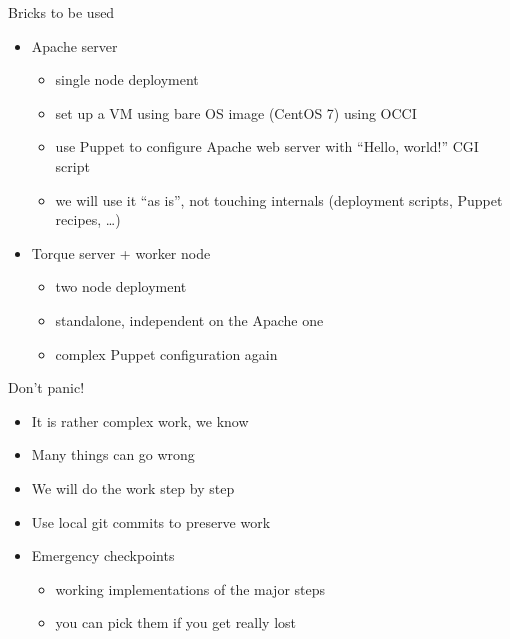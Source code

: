 \documentclass[smaller,t]{beamer}
\begin{document}
\begin{frame}{Bricks to be used}
\begin{itemize}
\item Apache server
\begin{itemize}
\item single node deployment
\item set up a VM using bare OS image (CentOS 7) using OCCI
\item use Puppet to configure Apache web server with ``Hello, world!'' CGI script
\item we will use it ``as is'', not touching internals (deployment scripts, Puppet recipes, \dots)
\end{itemize}

\item Torque server + worker node
\begin{itemize}
\item two node deployment
\item standalone, independent on the Apache one
\item complex Puppet configuration again
\end{itemize}
\end{itemize}
\end{frame}

\begin{frame}{Don't panic!}
\begin{itemize}
\item It is rather complex work, we know
\item Many things can go wrong
\item We will do the work step by step
\item Use local git commits to preserve work
\item Emergency checkpoints
\begin{itemize}
\item working implementations of the major steps
\item you can pick them if you get really lost 
\end{itemize}
\end{itemize}
\end{frame}
\end{document}
